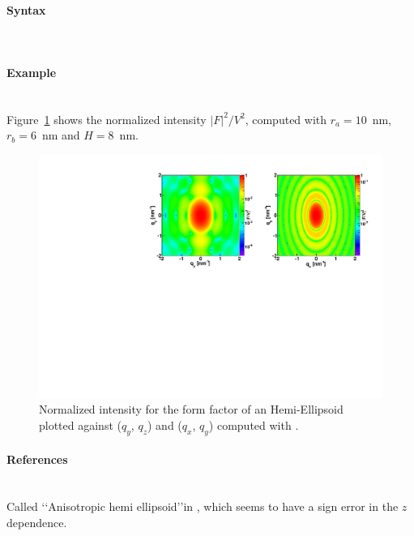 \paragraph{Syntax}\strut\\

\newpage

\paragraph{Example}\strut\\
Figure~\ref{fig:FFhemiellipsEx} shows the normalized intensity
$|F|^2/V^2$, computed with $r_a=10$~nm, $r_b=6$~nm and $H=8$~nm.

\begin{figure}[ht]
\begin{center}
\includegraphics[angle=-90,width=\textwidth]{fig/ff/figffhemiellips.pdf}
\end{center}
\caption{Normalized intensity for the form factor of an Hemi-Ellipsoid plotted against ($q_y$, $q_z$) and  ($q_x$, $q_y$)
  computed with .}
\label{fig:FFhemiellipsEx}
\end{figure}

\paragraph{References}\strut\\
Called \lq\lq Anisotropic hemi ellipsoid\rq\rq in ,
which seems to have a sign error in the $z$ dependence.


